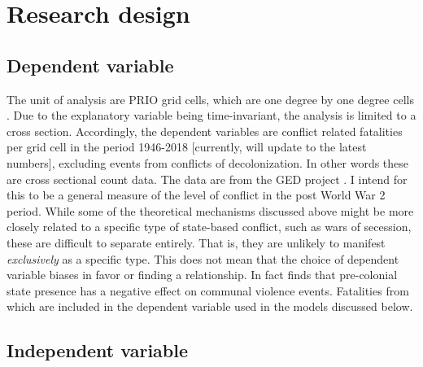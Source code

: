 \documentclass[12pt]{article}
\begin{document}

\section{Research design}

\subsection{Dependent variable}

The unit of analysis are PRIO grid cells, which are one degree by one degree
cells \citep{Tollefsen2012}. Due to the explanatory variable being
time-invariant, the analysis is limited to a cross section. Accordingly, the
dependent variables are conflict related fatalities per grid cell in the period
1946-2018 [currently, will update to the latest numbers], excluding events from
conflicts of decolonization. In other words these are cross sectional count
data. The data are from the GED project \citep{Sundberg2013}. I intend for this
to be a general measure of the level of conflict in the post World War 2 period.
While some of the theoretical mechanisms discussed above might be more closely
related to a specific type of state-based conflict, such as wars of secession,
these are difficult to separate entirely. That is, they are unlikely to manifest
\textit{exclusively} as a specific type. This does not mean that the choice of
dependent variable biases in favor or finding a relationship. In fact
\citet{Wishman2021a} finds that pre-colonial state presence has a negative
effect on communal violence events. Fatalities from which are included in the
dependent variable used in the models discussed below.


\subsection{Independent variable}
\end{document}
